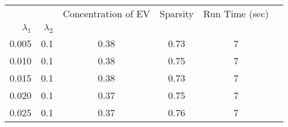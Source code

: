 \begin{tabular}{rr|cccc}
\toprule
      &     &  Concentration of EV &  Sparsity & Run Time (sec) \\
$\lambda_1$ & $\lambda_2$ &                      &           &                \\
\midrule
0.005 & 0.1 &                 0.38 &      0.73 &              7 \\
0.010 & 0.1 &                 0.38 &      0.75 &              7 \\
0.015 & 0.1 &                 0.38 &      0.73 &              7 \\
0.020 & 0.1 &                 0.37 &      0.75 &              7 \\
0.025 & 0.1 &                 0.37 &      0.76 &              7 \\
\bottomrule
\end{tabular}
